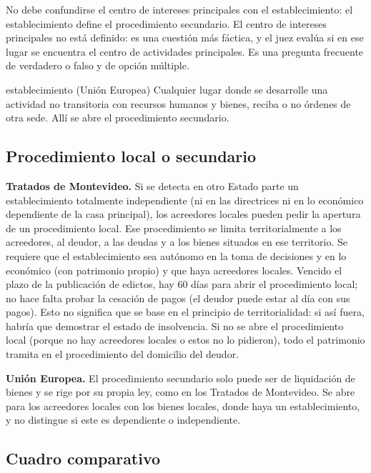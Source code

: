\documentclass[12pt,oneside]{book}
\begin{document}
\begin{important}
No debe confundirse el centro de intereses principales con el establecimiento: el establecimiento define el procedimiento secundario. El centro de intereses principales no está definido: es una cuestión más fáctica, y el juez evalúa si en ese lugar se encuentra el centro de actividades principales. Es una pregunta frecuente de verdadero o falso y de opción múltiple.
\end{important}

\begin{definition}{establecimiento (Unión Europea)}
Cualquier lugar donde se desarrolle una actividad no transitoria con recursos humanos y bienes, reciba o no órdenes de otra sede. Allí se abre el procedimiento secundario.
\end{definition}

\subsection{Procedimiento local o secundario}

\textbf{Tratados de Montevideo.} Si se detecta en otro Estado parte un establecimiento totalmente independiente (ni en las directrices ni en lo económico dependiente de la casa principal), los acreedores locales pueden pedir la apertura de un procedimiento local. Ese procedimiento se limita territorialmente a los acreedores, al deudor, a las deudas y a los bienes situados en ese territorio. Se requiere que el establecimiento sea autónomo en la toma de decisiones y en lo económico (con patrimonio propio) y que haya acreedores locales. Vencido el plazo de la publicación de edictos, hay 60 días para abrir el procedimiento local; no hace falta probar la cesación de pagos (el deudor puede estar al día con sus pagos). Esto no significa que se base en el principio de territorialidad: si así fuera, habría que demostrar el estado de insolvencia. Si no se abre el procedimiento local (porque no hay acreedores locales o estos no lo pidieron), todo el patrimonio tramita en el procedimiento del domicilio del deudor.

\textbf{Unión Europea.} El procedimiento secundario solo puede ser de liquidación de bienes y se rige por su propia ley, como en los Tratados de Montevideo. Se abre para los acreedores locales con los bienes locales, donde haya un establecimiento, y no distingue si este es dependiente o independiente.

\subsection{Cuadro comparativo}
\end{document}
